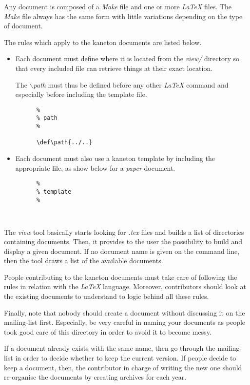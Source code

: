 Any document is composed of a \textit{Make} file and one or more
\textit{\LaTeX} files. The \textit{Make} file always has the same form
with little variations depending on the type of document.

The rules which apply to the kaneton documents are listed below.

\begin{itemize}
  \item
    Each document must define where it is located from the \textit{view/}
    directory so that every included file can retrieve things at their exact
    location.

    The \textit{$\backslash$path} must thus be defined before any other
    \textit{\LaTeX} command and especially before including the template
    file.

    \begin{verbatim}
      %
      % path
      %

      \def\path{../..}
    \end{verbatim}
  \item
    Each document must also use a kaneton template by including the
    appropriate file, as show below for a \textit{paper} document.

    \begin{verbatim}
      %
      % template
      %

      
    \end{verbatim}
\end{itemize}

The \textit{view} tool basically starts looking for \textit{.tex} files
and builds a list of directories containing documents. Then, it provides
to the user the possibility to build and display a given document. If no
document name is given on the command line, then the tool draws a list
of the available documents.

People contributing to the kaneton documents must take care of following
the rules in relation with the \textit{\LaTeX} language. Moreover, contributors
should look at the existing documents to understand to logic behind all
these rules.

Finally, note that nobody should create a document without discussing it
on the mailing-list first. Especially, be very careful in naming your
documents as people took good care of this directory in order to avoid
it to become messy.

If a document already exists with the same name, then go through the
mailing-list in order to decide whether to keep the current version. If
people decide to keep a document, then, the contributor in charge of writing
the new one should re-organise the documents by creating archives for
each year.
